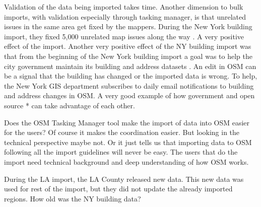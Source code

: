 Validation of the data being imported takes time. Another dimension to bulk imports, with validation especially through tasking manager, is that unrelated issues in the same area get fixed by the mappers. During the New York building import, they fixed 5,000 unrelated map issues along the way \cite{Barth2014}. A very positive effect of the import. Another very positive effect of the NY building import was that from the beginning of the New York building import a goal was to help the city government maintain its building and address datasets \cite{Barth2014b}. An edit in OSM can be a signal that the building has changed or the imported data is wrong. To help, the New York GIS department subscribes to daily email notifications to building and address changes in OSM. A very good example of how government and open source *%
  can take advantage of each other. 

Does the OSM Tasking Manager tool make the import of data into OSM easier for the users? Of course it makes the coordination easier. But looking in the technical perspective maybe not. Or it just tells us that importing data to OSM following all the import guidelines will never be easy. The users that do the import need technical background and deep understanding of how OSM works. 

During the LA import, the LA County released new data. This new data was used for rest of the import, but they did not update the already imported regions.  %
How old was the NY building data?
